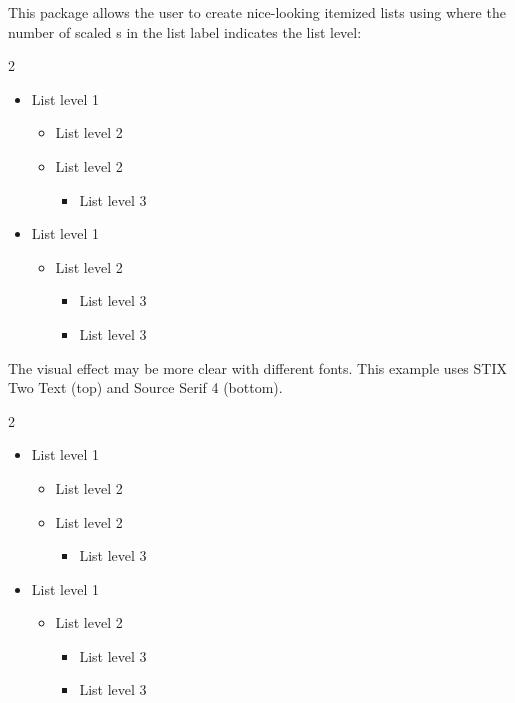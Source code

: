\documentclass{beerydoc}
\begin{document}
This package allows the user to create nice-looking itemized lists using
 where the number of scaled s in the list
label indicates the list level:

\begin{multicols}{2}
  \begin{itemize}
    \item List level 1
    \begin{itemize}
      \item List level 2
      \item List level 2
      \begin{itemize}
        \item List level 3
      \end{itemize}
    \end{itemize}
    \item List level 1
    \begin{itemize}
      \item List level 2
      \begin{itemize}
        \item List level 3
        \item List level 3
      \end{itemize}
    \end{itemize}
  \end{itemize}
\end{multicols}

The visual effect may be more clear with different fonts.
This example uses STIX Two Text (top) and Source Serif 4 (bottom).

\begingroup
  \newfontfamilystixtwo
  \begin{multicols}{2}
    \begin{itemize}
      \item List level 1
      \begin{itemize}
        \item List level 2
        \item List level 2
        \begin{itemize}
          \item List level 3
        \end{itemize}
      \end{itemize}
      \item List level 1
      \begin{itemize}
        \item List level 2
        \begin{itemize}
          \item List level 3
          \item List level 3
        \end{itemize}
      \end{itemize}
    \end{itemize}
  \end{multicols}
\endgroup
\end{document}
